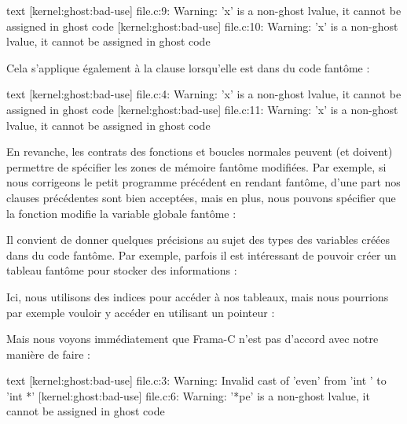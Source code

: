 

\begin{CodeBlock}{text}
[kernel:ghost:bad-use] file.c:9: Warning:
  'x' is a non-ghost lvalue, it cannot be assigned in ghost code
[kernel:ghost:bad-use] file.c:10: Warning:
  'x' is a non-ghost lvalue, it cannot be assigned in ghost code
\end{CodeBlock}


Cela s'applique également à la clause  lorsqu'elle est dans
du code fantôme :




\begin{CodeBlock}{text}
[kernel:ghost:bad-use] file.c:4: Warning:
  'x' is a non-ghost lvalue, it cannot be assigned in ghost code
[kernel:ghost:bad-use] file.c:11: Warning:
  'x' is a non-ghost lvalue, it cannot be assigned in ghost code
\end{CodeBlock}


En revanche, les contrats des fonctions et boucles normales peuvent (et doivent)
permettre de spécifier les zones de mémoire fantôme modifiées. Par exemple, si
nous corrigeons le petit programme précédent en rendant  fantôme,
d'une part nos clauses  précédentes sont bien acceptées,
mais en plus, nous pouvons spécifier que la fonction  modifie
la variable globale fantôme  :






Il convient de donner quelques précisions au sujet des types des variables
créées dans du code fantôme. Par exemple, parfois il est intéressant de pouvoir
créer un tableau fantôme pour stocker des informations :




Ici, nous utilisons des indices pour accéder à nos tableaux, mais nous pourrions
par exemple vouloir y accéder en utilisant un pointeur :




Mais nous voyons immédiatement que Frama-C n'est pas d'accord avec notre manière
de faire :


\begin{CodeBlock}{text}
[kernel:ghost:bad-use] file.c:3: Warning:
  Invalid cast of 'even' from 'int \ghost *' to 'int *'
[kernel:ghost:bad-use] file.c:6: Warning:
  '*pe' is a non-ghost lvalue, it cannot be assigned in ghost code
\end{CodeBlock}


